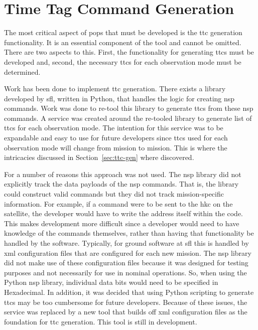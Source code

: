 

\section{Time Tag Command Generation}

The most critical aspect of \gls{pops} that must be developed is the \gls{ttc}
generation functionality. It is an essential component of the tool and cannot
be omitted. There are two aspects to this. First, the functionality for
generating \glspl{ttc} must be developed and, second, the necessary \glspl{ttc}
for each observation mode must be determined.

Work has been done to implement \gls{ttc} generation. There exists a library
developed by \gls{sfl}, written in Python, that handles the logic for creating
\gls{nsp} commands. Work was done to re-tool this library to generate
\glspl{ttc} from these \gls{nsp} commands. A service was created around the
re-tooled library to generate list of \glspl{ttc} for each observation mode.
The intention for this service was to be expandable and easy to use for future
developers since \glspl{ttc} used for each observation mode will change from
mission to mission. This is where the intricacies discussed in
Section~\ref{sec:ttc-gen} where discovered.  

For a number of reasons this approach was not used. The \gls{nsp} library did
not explicitly track the data payloads of the \gls{nsp} commands.  That is, the
library could construct valid commands but they did not track mission-specific
information.  For example, if a command were to be sent to the \gls{hkc} on the
satellite, the developer would have to write the address itself within the
code. This makes development more difficult since a developer would need to
have knowledge of the commands themselves, rather than having that
functionality be handled by the software.  Typically, for ground software at
\gls{sfl} this is handled by \gls{xml} configuration files that are configured
for each new mission.  The \gls{nsp} library did not make use of these
configuration files because it was designed for testing purposes and not
necessarily for use in nominal operations. So, when using the Python \gls{nsp}
library, individual data bits would need to be specified in Hexadecimal. In
addition, it was decided that using Python scripting to generate \glspl{ttc}
may be too cumbersome for future developers. Because of these issues, the
service was replaced by a new tool that builds off \gls{xml} configuration
files as the foundation for \gls{ttc} generation.  This tool is still in
development.  

